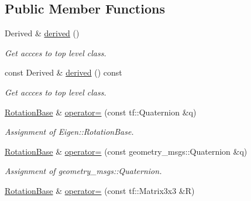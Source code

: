 \subsection*{Public Member Functions}
\begin{DoxyCompactItemize}
\item 
Derived \& \hyperlink{classow__core_1_1RotationBase_abbbbbdfbcd1cea471d199fdc4903438a}{derived} ()\hypertarget{classow__core_1_1RotationBase_abbbbbdfbcd1cea471d199fdc4903438a}{}\label{classow__core_1_1RotationBase_abbbbbdfbcd1cea471d199fdc4903438a}

\begin{DoxyCompactList}\small\item\em Get accces to top level class. \end{DoxyCompactList}\item 
const Derived \& \hyperlink{classow__core_1_1RotationBase_a5dfa98b8c62904e74549701c98b4b2cb}{derived} () const \hypertarget{classow__core_1_1RotationBase_a5dfa98b8c62904e74549701c98b4b2cb}{}\label{classow__core_1_1RotationBase_a5dfa98b8c62904e74549701c98b4b2cb}

\begin{DoxyCompactList}\small\item\em Get accces to top level class. \end{DoxyCompactList}\item 
\hyperlink{classow__core_1_1RotationBase}{Rotation\+Base} \& \hyperlink{classow__core_1_1RotationBase_a78e7c43cd3c54770349f45446354893c}{operator=} (const tf\+::\+Quaternion \&q)
\begin{DoxyCompactList}\small\item\em Assignment of Eigen\+::\+Rotation\+Base. \end{DoxyCompactList}\item 
\hyperlink{classow__core_1_1RotationBase}{Rotation\+Base} \& \hyperlink{classow__core_1_1RotationBase_a935779130722f903e82c08fbf03d235e}{operator=} (const geometry\+\_\+msgs\+::\+Quaternion \&q)\hypertarget{classow__core_1_1RotationBase_a935779130722f903e82c08fbf03d235e}{}\label{classow__core_1_1RotationBase_a935779130722f903e82c08fbf03d235e}

\begin{DoxyCompactList}\small\item\em Assignment of geometry\+\_\+msgs\+::\+Quaternion. \end{DoxyCompactList}\item 
\hyperlink{classow__core_1_1RotationBase}{Rotation\+Base} \& \hyperlink{classow__core_1_1RotationBase_a2c7d4df085aa6cb6c2369728e1dc5537}{operator=} (const tf\+::\+Matrix3x3 \&R)\hypertarget{classow__core_1_1RotationBase_a2c7d4df085aa6cb6c2369728e1dc5537}{}\label{classow__core_1_1RotationBase_a2c7d4df085aa6cb6c2369728e1dc5537}


\end{DoxyCompactItemize}
